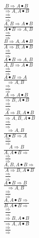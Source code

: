 \documentclass[11pt]{article}
\begin{document}
\begin{center}

$\frac{B\Rightarrow A\bullet B}{\Rightarrow A, A\bullet B}$
\bigskip
\\$\frac{\Rightarrow }{\Rightarrow }$
\bigskip
\\$\frac{A, B\Rightarrow A\bullet B}{A\bullet B\Rightarrow A, B}$
\bigskip
\\$\frac{\Rightarrow }{\Rightarrow }$
\bigskip
\\$\frac{B\Rightarrow A, A\bullet B}{A\Rightarrow B, A\bullet B}$
\bigskip
\\$\frac{\Rightarrow }{\Rightarrow }$
\bigskip
\\$\frac{A\bullet B\Rightarrow A, B}{A, B\Rightarrow A\bullet B}$
\bigskip
\\$\frac{\Rightarrow }{\Rightarrow }$
\bigskip
\\$\frac{A\bullet B\Rightarrow A}{\Rightarrow A, B}$
\bigskip
\\$\frac{\Rightarrow }{\Rightarrow }$
\bigskip
\\$\frac{A\Rightarrow A\bullet B}{\Rightarrow B, A\bullet B}$
\bigskip
\\$\frac{\Rightarrow }{\Rightarrow }$
\bigskip
\\$\frac{A\Rightarrow B, A\bullet B}{\Rightarrow A, B, A\bullet B}$
\bigskip
\\$\frac{\Rightarrow }{\Rightarrow }$
\bigskip
\\$\frac{\Rightarrow A, B}{A\bullet B\Rightarrow A}$
\bigskip
\\$\frac{\Rightarrow }{\Rightarrow }$
\bigskip
\\$\frac{A\Rightarrow B}{A, A\bullet B\Rightarrow }$
\bigskip
\\$\frac{\Rightarrow }{\Rightarrow }$
\bigskip
\\$\frac{A, B, A\bullet B\Rightarrow }{A\Rightarrow B, A\bullet B}$
\bigskip
\\$\frac{\Rightarrow }{\Rightarrow }$
\bigskip
\\$\frac{A\bullet B\Rightarrow B}{\Rightarrow A, B}$
\bigskip
\\$\frac{\Rightarrow }{\Rightarrow }$
\bigskip
\\$\frac{A, A\bullet B\Rightarrow }{B, A\bullet B\Rightarrow }$
\bigskip
\\$\frac{\Rightarrow }{\Rightarrow }$
\bigskip
\\$\frac{\Rightarrow B, A\bullet B}{\Rightarrow A, A\bullet B}$
\bigskip
\\$\frac{\Rightarrow }{\Rightarrow }$

\end{center}
\end{document}
